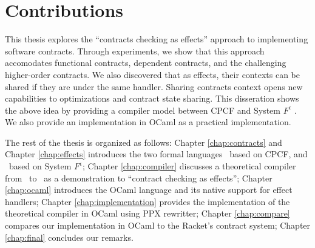 \section{Contributions}



This thesis explores the ``contracts checking as effects'' approach to
implementing software contracts. Through experiments, we show that this
approach accomodates functional contracts, dependent contracts, and the
challenging higher-order contracts. We also discovered that as effects, their
contexts can be shared if they are under the same handler. Sharing contracts
context opens new capabilities to optimizations and contract state sharing.
This disseration shows the above idea by providing a compiler model between
CPCF \cite{cpcf} and System $F^\epsilon$ \cite{xie2020effect}. We also provide
an implementation in OCaml as a practical implementation.

The rest of the thesis is organized as follows: Chapter \ref{chap:contracts}
and Chapter \ref{chap:effects} introduces the two formal languages \langc\
based on CPCF, and \lange\ based on System $F^\epsilon$; Chapter
\ref{chap:compiler} discusses a theoretical compiler from \langc\ to \lange\ as
a demonstration to ``contract checking as effects''; Chapter \ref{chap:ocaml}
introduces the OCaml language and its native support for effect handlers;
Chapter \ref{chap:implementation} provides the implementation of the
theoretical compiler in OCaml using PPX rewritter; Chapter \ref{chap:compare}
compares our implementation in OCaml to the Racket's contract system; Chapter
\ref{chap:final} concludes our remarks.
